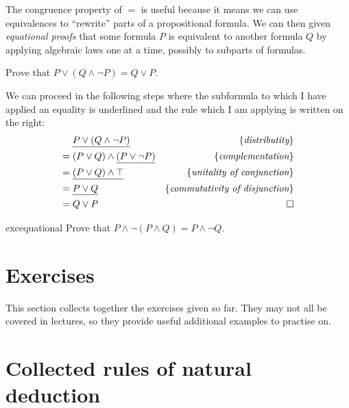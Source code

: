 The congruence property of $=$ is useful because it means we can use
equivalences to ``rewrite'' parts of a propositional formula.
We can then given \emph{equational proofs} that
some formula $P$ is equivalent to another formula $Q$
by applying  algebraic laws one at a time, possibly
to subparts of formulas.

\begin{example}
  Prove that $P \vee (Q \wedge \neg P) = Q \vee P$.

  We can proceed in the following steps where the subformula
  to which I have applied an equality is underlined and the rule
  which I am applying is written on the right:
  \begin{align*}
  & \underline{P \vee (Q \wedge \neg P)} & \{\textit{distributity}\} \\
= \; & (P \vee Q) \wedge \underline{(P \vee \neg P)}  & \{\textit{complementation}\}  \\
= \; & \underline{(P \vee Q) \wedge \top} &  \{\textit{unitality of conjunction}\} \\
= \; & \underline{P \vee Q} & \{\textit{commutativity of disjunction}\} \\
= \; & Q \vee P & \qquad \qed
\end{align*}
\end{example}

\begin{restatable}{exc}{equational}
Prove that $P \wedge \neg(P \wedge Q) = P \wedge \neg Q$.
\end{restatable}

\section{Exercises}

  This section collects together the exercises given so far. They may
  not all be covered in lectures, so they provide useful
  additional examples to practise on.

  \assoc*
  \andReproof*
  \implProperty*
  \kcombinator*
  \biimplRules*
  \orassoc*
  \disproveEx*
  \lemp*
  \unitality*
  \equational*

\section{Collected rules of natural deduction}

\vspace{-1em}
\setlength{\tabcolsep}{1.54em}
\renewcommand{\arraystretch}{1}

